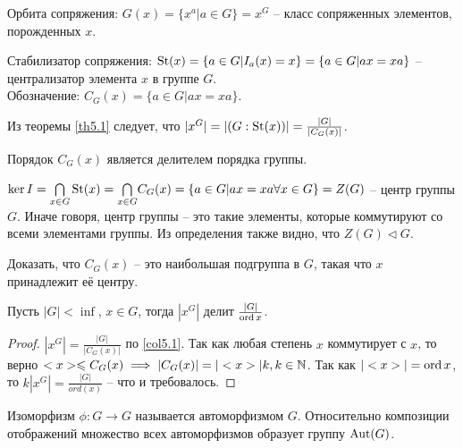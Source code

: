 \begin{definition}
    Орбита сопряжения: $G(x) = \{ x^a | a \in G \} = x^G$ -- класс сопряженных элементов, порожденных $x$.
\end{definition}

\begin{definition}
    Стабилизатор сопряжения: $\operatorname{\text{St}}(x) = \{ a \in G | I_a(x) = x \} = \{ a \in G | ax = xa \}$ -- централизатор элемента $x$ в группе $G$. \\
    Обозначение: $C_G(x) = \{ a \in G | ax = xa \}$.
\end{definition}

\begin{corollary}
\label{col5.1}
    Из теоремы \ref{th5.1} следует, что $|x^G| = |(G : \operatorname{\text{St}}(x))| = \frac{|G|}{|C_G(x)|}$.
\end{corollary}

\begin{corollary}
    Порядок $C_G(x)$ является делителем порядка группы.
\end{corollary}

\begin{definition}
    $\ker I = \underset{x \in G}{\bigcap}\operatorname{\text{St}}(x) = \underset{x \in G}{\bigcap} C_G(x) = \{ a \in G | ax = xa \forall x \in G \} = Z(G)$ -- центр группы $G$. Иначе говоря, центр группы -- это такие элементы, которые коммутируют со всеми элементами группы. Из определения также видно, что $Z(G) \triangleleft G$.
\end{definition}

\begin{exercise}
    Доказать, что $C_G(x)$ -- это наибольшая подгруппа в $G$, такая что $x$ принадлежит её центру.
\end{exercise}

\begin{proposition}
    Пусть $|G| < \inf$, $x \in G$, тогда $|x^G|$ делит $\frac{|G|}{\operatorname{ord} x}$.
\end{proposition}

\begin{proof}
    $|x^G| = \frac{|G|}{|C_G(x)|}$ по \ref{col5.1}. Так как любая степень $x$ коммутирует с $x$, то верно $<x> \leqslant C_G(x) \implies |C_G(x)| = |<x>|k, k \in \mathbb{N}$. Так как $|<x>| = \operatorname{ord} x$, то $k|x^G| = \frac{|G|}{ord(x)}$ -- что и требовалось.
\end{proof}

\begin{definition}
    Изоморфизм $\phi: G \to G$ называется автоморфизмом $G$. Относительно композиции отображений множество всех автоморфизмов образует группу $\operatorname{Aut}(G)$.
\end{definition}

